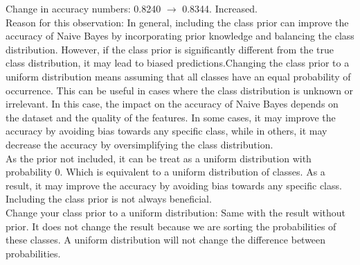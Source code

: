Change in accuracy numbers: 0.8240 $\to$ 0.8344. Increased.\\
Reason for this observation: In general, including the class prior can improve the accuracy of Naive Bayes by incorporating prior knowledge and balancing the class distribution. However, if the class prior is significantly different from the true class distribution, it may lead to biased predictions.Changing the class prior to a uniform distribution means assuming that all classes have an equal probability of occurrence. This can be useful in cases where the class distribution is unknown or irrelevant. In this case, the impact on the accuracy of Naive Bayes depends on the dataset and the quality of the features. In some cases, it may improve the accuracy by avoiding bias towards any specific class, while in others, it may decrease the accuracy by oversimplifying the class distribution.\\
As the prior not included, it can be treat as a uniform distribution with probability 0. Which is equivalent to a uniform distribution of classes. As a result, it may improve the accuracy by avoiding bias towards any specific class.
Including the class prior is not always beneficial.\\
Change your class prior to a uniform distribution: Same with the result without prior. It does not change the result because we are sorting the probabilities of these classes. A uniform distribution will not change the difference between probabilities.



